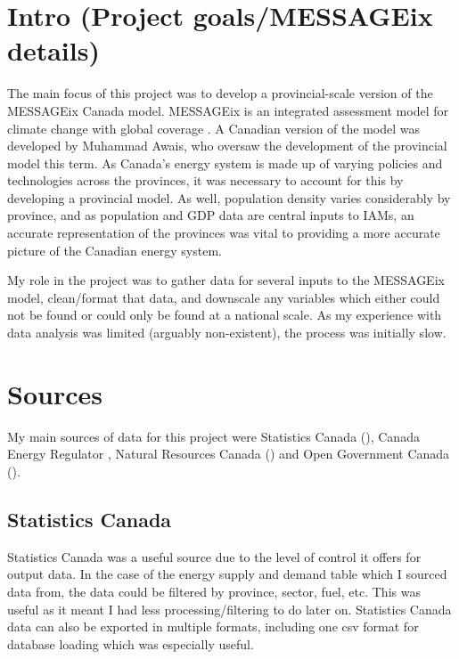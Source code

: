 \documentclass{article}
\begin{document}

\section{Intro (Project goals/MESSAGEix details)}

The main focus of this project was to develop a provincial-scale version of the MESSAGEix Canada model. MESSAGEix is an integrated assessment model for climate change with global coverage \citep{messageDocs}. A Canadian version of the model was developed by Muhammad Awais, who oversaw the development of the provincial model this term. As Canada's energy system is made up of varying policies and technologies across the provinces, it was necessary to account for this by developing a provincial model. As well, population density varies considerably by province, and as population and GDP data are central inputs to IAMs, an accurate representation of the provinces was vital to providing a more accurate picture of the Canadian energy system. 

My role in the project was to gather data for several inputs to the MESSAGEix model, clean/format that data, and downscale any variables which either could not be found or could only be found at a national scale. As my experience with data analysis was limited (arguably non-existent), the process was initially slow. 

\section{Sources}

My main sources of data for this project were Statistics Canada (\citeyear{statCan}), Canada Energy Regulator \citep{CER}, Natural Resources Canada (\citeyear{nrcan}) and Open Government Canada (\citeyear{openGov}).

\subsection{Statistics Canada}

Statistics Canada was a useful source due to the level of control it offers for output data. In the case of the energy supply and demand table which I sourced data from, the data could be filtered by province, sector, fuel, etc. This was useful as it meant I had less processing/filtering to do later on. Statistics Canada data can also be exported in multiple formats, including one csv format for database loading which was especially useful.
\end{document}
